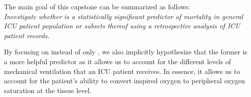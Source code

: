 The main goal of this capstone can be summarized as follows: \\
\textit{ Investigate whether \SF is a statistically significant predictor of mortality in general ICU patient population or subsets thereof using a retrospective analysis of ICU patient records.
}

By focusing on \SF instead of only \Sp, we also implicitly hypothesize that the former is a more helpful predictor as it allows us to account for the different levels of mechanical ventilation that an ICU patient receives. In essence, it allows us to account for the patient's ability to convert inspired oxygen to peripheral oxygen saturation at the tissue level. 






